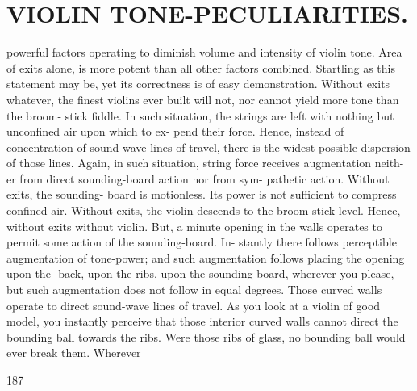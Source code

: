 \documentclass{article}
\begin{document}
\section*{VIOLIN TONE-PECULIARITIES.}
powerful factors operating to diminish volume and intensity of violin tone. Area of exits alone, is more potent than all other factors combined. Startling as this statement may be, yet its correctness is of easy demonstration. Without exits whatever, the finest violins ever built will not, nor cannot yield more tone than the broom- stick fiddle. In such situation, the strings are left with nothing but unconfined air upon which to ex- pend their force. Hence, instead of concentration of sound-wave lines of travel, there is the widest possible dispersion of those lines. Again, in such situation, string force receives augmentation neith- er from direct sounding-board action nor from sym- pathetic action. Without exits, the sounding- board is motionless. Its power is not sufficient to compress confined air. Without exits, the violin descends to the broom-stick level. Hence, without exits without violin. But, a minute opening in the walls operates to permit some action of the sounding-board. In- stantly there follows perceptible augmentation of tone-power; and such augmentation follows placing the opening upon the- back, upon the ribs, upon the sounding-board, wherever you please, but such augmentation does not follow in equal degrees. Those curved walls operate to direct sound-wave lines of travel. As you look at a violin of good model, you instantly perceive that those interior curved walls cannot direct the bounding ball towards the ribs. Were those ribs of glass, no bounding ball would ever break them. Wherever

187
\end{document}
